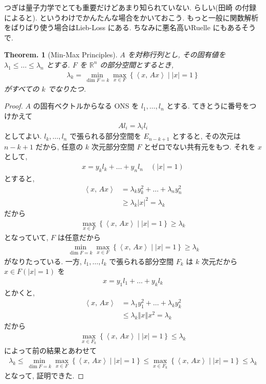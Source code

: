 \documentclass[openany, a4paper, oneside]{jsbook}
\theoremstyle{break}
\theoremstyle{breakdefn}
\newtheorem{thm}{Theorem.}[section]
\newcommand{\abs}[1]{\left|#1\right|}
\newcommand{\norm}[1]{\left\Vert#1\right\Vert}
\newcommand{\bkt}[2]{\left\langle#1,\,#2\right\rangle}
\newcommand{\relmiddle}[1]{\mathrel{}\middle#1\mathrel{}}
\newcommand{\set}[2]{\left\{#1 \relmiddle| #2\right\}}
\begin{document}
つぎは量子力学でとても重要だけどあまり知られていない.
らしい(田崎 \cite{HalTasaki3}の付録によると).
というわけでかんたんな場合をかいておこう.
もっと一般に関数解析をばりばり使う場合はLieb-Loss \cite{LiebLoss1}にある.
ちなみに悪名高いRuelle \cite{DavidRuelle1}にもあるそうで.
\begin{thm}[Min-Max Principles]
 $A$ を対称行列とし, その固有値を $\lambda_1 \le \dots \le \lambda_n$
 とする.
 $F$ を $\mathbb{R}^n$ の部分空間とするとき,
 \begin{align}
  \lambda_k
  =
  \min_{\dim F=k} \max_{x \in F} \set{\bkt{x}{Ax}}{\abs{x} = 1}
 \end{align}
 がすべての $k$ でなりたつ.
\end{thm}
\begin{proof}
$A$ の固有ベクトルからなる ONS を $l_1, \dots , l_n$ とする.
てきとうに番号をつけかえて
\begin{align}
 Al_i
 =
 \lambda_i l_i
\end{align}
としてよい.
$l_k, \dots , l_n$ で張られる部分空間を $E_{n-k+1}$ とすると,
その次元は $n-k+1$ だから, 任意の $k$ 次元部分空間 $F$ とゼロでない共有元をもつ.
それを $x$ として,
\begin{align}
 x
 =
 y_k l_k + \dots + y_n l_n \quad (\abs{x} = 1)
\end{align}
とすると,
\begin{align}
 \bkt{x}{Ax}
 &=
 \lambda_k y_k^2 + \dots + \lambda_n y_n^2 \\
 &\ge
 \lambda_k |x|^2
 =
 \lambda_k
\end{align}
だから
\begin{align}
 \max_{x\in F } \set{\bkt{x}{Ax}}{\abs{x} = 1}
 \ge
 \lambda_k
\end{align}
となっていて, $F$ は任意だから
\begin{align}
 \min_{\dim F=k} \max_{x\in F} \set{\bkt{x}{Ax}}{\abs{x} = 1}
 \ge
 \lambda_k
\end{align}
がなりたっている.
一方, $l_1, \dots , l_k$ で張られる部分空間 $F_k$ は $k$ 次元だから $x \in F (\abs{x} = 1)$ を
\begin{align}
 x
 =
 y_1 l_1 + \dots + y_k l_k
\end{align}
とかくと,
\begin{align}
 \bkt{x}{Ax}
 &=
 \lambda_1 y_1^2 + \dots + \lambda_k y_k^2  \\
 &\le
 \lambda_k \norm{x}x^2
 =
 \lambda_k
\end{align}
だから
\begin{align}
 \max_{x \in F_k} \set{\bkt{x}{Ax}}{\abs{x} = 1}
 \le
 \lambda_k
\end{align}
によって前の結果とあわせて
\begin{align}
 \lambda_k
 \le
 \min_{\dim F=k} \max_{x \in F} \set{\bkt{x}{Ax}}{\abs{x} = 1}
 \le
 \max_{x \in F_k } \set{\bkt{x}{Ax}}{\abs{x} = 1}
 \le
 \lambda_k
\end{align}
となって, 証明できた.
\end{proof}
\end{document}
